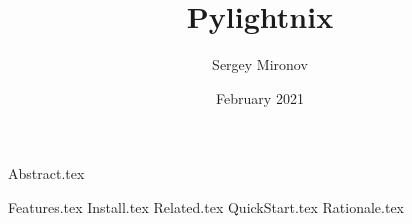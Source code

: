 \documentclass{article}
\begin{document}

\title{Pylightnix}
\author{Sergey Mironov}
\date{February 2021}
\maketitle

{Abstract.tex}

{Features.tex}
{Install.tex}
{Related.tex}
{QuickStart.tex}
{Rationale.tex}
\end{document}
